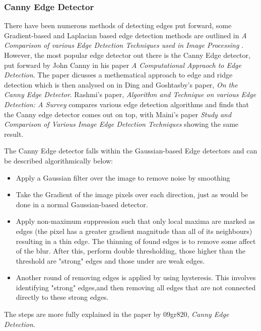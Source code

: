 \documentclass[11pt]{article}
\begin{document}
\subsubsection{Canny Edge Detector}
\label{sec:Canny}

There have been numerous methods of detecting edges put forward,
some Gradient-based and Laplacian based edge detection methods are 
outlined in 
\textit{A Comparison of various Edge Detection Techniques used in Image Processing}
\cite{Shriv12}. However, the most popular edge detector out there is the
Canny Edge detector, put forward by John Canny in his paper
\textit{A Computational Appraoch to Edge Detection}\cite{Canny86}. The paper
dicusses a methematical approach to edge and ridge detection which is then
analysed on in Ding and Goshtasby's paper, 
\textit{On the Canny Edge Detector}\cite{Ding00}. Rashmi's paper,
\textit{Algorithm and Technique on various Edge Detection: A Survey}
\cite{Rashmi13} compares various edge detection algorithms and finds that 
the Canny edge detector comes out on top, with Maini's paper 
\textit{Study and Comparison of Various Image Edge Detection Techniques} 
\cite{Maini} showing the same result.

The Canny Edge detector falls within the Gaussian-based Edge detectors and
can be described algorithmically below:
\begin{itemize}
	\item Apply a Gaussian filter over the image to remove noise by smoothing
	\item Take the Gradient of the image pixels over each direction, just as
		  would be done in a normal Gaussian-based detector.
	\item Apply non-maximum suppression 
		  such that only local maxima are marked as edges (the pixel 
		  has a greater gradient magnitude than all
		  of its neighbours) resulting in a thin edge. The thinning of found
		  edges is to remove some affect of the blur. After this, perform
		  double thresholding, those higher than the threshold are "strong" edges
		  and those under are weak edges.
	\item Another round of removing edges is applied by using hysteresis.
		  This involves identifying "strong" edges,and then removing 
		  all edges that are not connected directly to these strong edges.
\end{itemize}

The steps are more fully explained in the paper by 09gr820, 
\textit{Canny Edge Detection}\cite{09gr820}.
\end{document}

